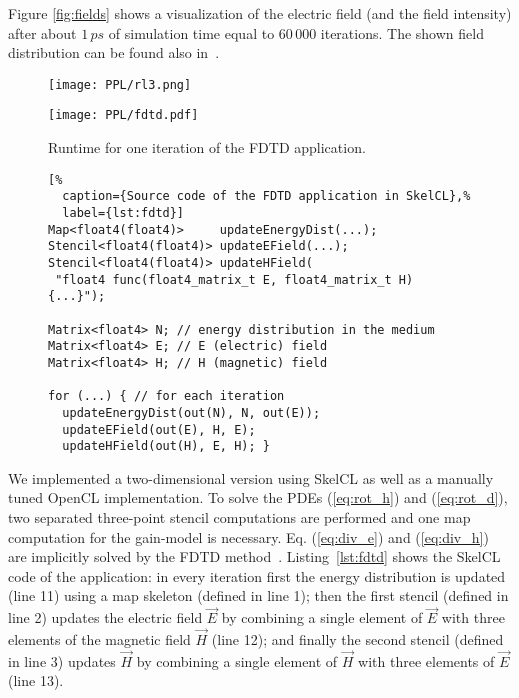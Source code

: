 Figure \ref{fig:fields} shows a visualization of the electric field (and the field intensity) after about  $1\,ps$ of simulation time equal to $60\,000$ iterations.
The shown field distribution can be found also in~\cite{Cao2000, Sebbah2002, Yamilov2005}.%

\begin{figure}[t]
	\begin{minipage}[b]{.48\textwidth}
    \centering
	  \texttt{[image: PPL/rl3.png]}
    \caption[A 3D representation of the inensity of the 2D electric field as computed by the \SkelCL FDTD implementation.]%
            {\small The image shows a 3D representation of the intensity for the 2D electric field as computed by the SkelCL FDTD implementation after $60\,000$ iterations.}
	  \label{fig:fields}
  \end{minipage}
  \hspace{.02\textwidth}
  \begin{minipage}[b]{.48\textwidth}
    \centering
	  \texttt{[image: PPL/fdtd.pdf]}
  	\caption{\small Runtime for one iteration of the FDTD application.}
  	\label{fig:fdtd_eval}
  \end{minipage}
  \bigskip
\end{figure}

\begin{figure}[tbp]
\begin{lstlisting}[%
  caption={Source code of the FDTD application in SkelCL},%
  label={lst:fdtd}]
Map<float4(float4)>     updateEnergyDist(...);
Stencil<float4(float4)> updateEField(...);
Stencil<float4(float4)> updateHField(
 "float4 func(float4_matrix_t E, float4_matrix_t H) {...}");

Matrix<float4> N; // energy distribution in the medium
Matrix<float4> E; // E (electric) field
Matrix<float4> H; // H (magnetic) field

for (...) { // for each iteration
  updateEnergyDist(out(N), N, out(E));  
  updateEField(out(E), H, E);
  updateHField(out(H), E, H); }
\end{lstlisting}
\end{figure}

We implemented a two-dimensional version using SkelCL as well as a manually tuned OpenCL implementation.
To solve the PDEs (\ref{eq:rot_h}) and (\ref{eq:rot_d}), two separated three-point stencil computations are performed and one map computation for the gain-model is necessary.
Eq. (\ref{eq:div_e}) and (\ref{eq:div_h}) are implicitly solved by the FDTD method~\cite{Yee1966}.
Listing~\ref{lst:fdtd} shows the SkelCL code of the application:
in every iteration first the energy distribution is updated (line 11) using a map skeleton (defined in line 1);
then the first stencil (defined in line 2) updates the electric field $\vec{E}$ by combining a single element of $\vec{E}$ with three elements of the magnetic field $\vec{H}$ (line 12);
and finally the second stencil (defined in line 3) updates $\vec{H}$ by combining a single element of $\vec{H}$ with three elements of $\vec{E}$ (line 13).

